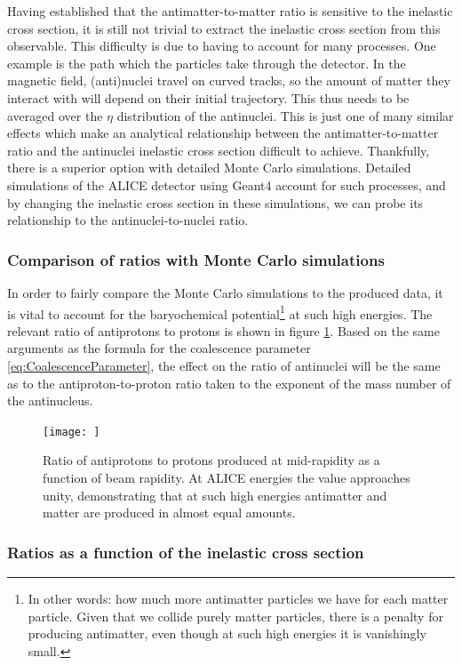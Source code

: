 Having established that the antimatter-to-matter ratio is sensitive to the inelastic cross section, it is still not trivial to extract the inelastic cross section from this observable. This difficulty is due to having to account for many processes. One example is the path which the particles take through the detector. In the magnetic field, (anti)nuclei travel on curved tracks, so the amount of matter they interact with will depend on their initial trajectory. This thus needs to be averaged over the $\eta$ distribution of the antinuclei. This is just one of many similar effects which make an analytical relationship between the antimatter-to-matter ratio and the antinuclei inelastic cross section difficult to achieve. Thankfully, there is a superior option with detailed Monte Carlo simulations. Detailed simulations of the ALICE detector using Geant4 account for such processes, and by changing the inelastic cross section in these simulations, we can probe its relationship to the antinuclei-to-nuclei ratio.
\subsubsection{Comparison of ratios with Monte Carlo simulations}\label{sec:MCSim}
In order to fairly compare the Monte Carlo simulations to the produced data, it is vital to account for the baryochemical potential\footnote{In other words: how much more antimatter particles we have for each matter particle. Given that we collide purely matter particles, there is a penalty for producing antimatter, even though at such high energies it is vanishingly small.} at such high energies. The relevant ratio of antiprotons to protons is shown in figure \ref{fig:BaryochemicalPotential}. Based on the same arguments as the formula for the coalescence parameter \ref{eq:CoalescenceParameter}, the effect on the ratio of antinuclei will be the same as to the antiproton-to-proton ratio taken to the exponent of the mass number of the antinucleus. 

\begin{figure}
    \centering
    \texttt{[image: ]}
    \caption{Ratio of antiprotons to protons produced at mid-rapidity as a function of beam rapidity. At ALICE energies the value approaches unity, demonstrating that at such high energies antimatter and matter are produced in almost equal amounts.}
    \label{fig:BaryochemicalPotential}
\end{figure}
\subsubsection{Ratios as a function of the inelastic cross section}
